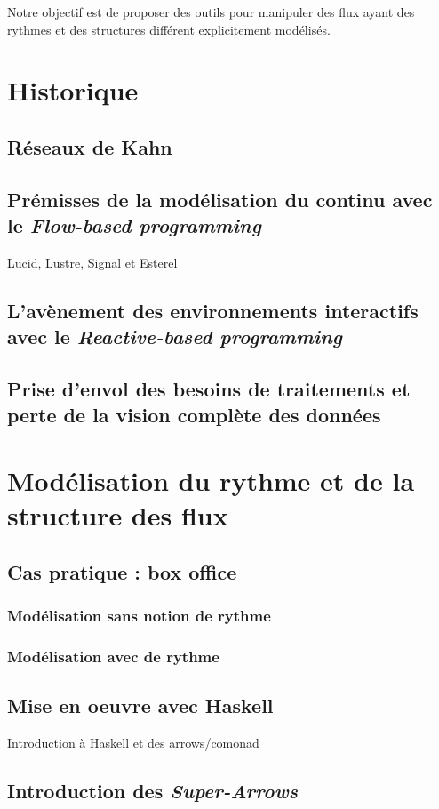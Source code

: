 \documentclass{llncs}
\newcommand{\SAs}{\emph{Super-Arrows}}
\newcommand{\FB}{\emph{Flow-based programming}}
\newcommand{\RP}{\emph{Reactive-based programming}}
\begin{document}
Notre objectif est de proposer des outils pour manipuler des flux ayant des
rythmes et des structures différent explicitement modélisés.

\section{Historique}
\subsection{Réseaux de Kahn}
\cite{kahn}
\subsection{Prémisses de la modélisation du continu avec le \FB}
Lucid, Lustre, Signal et Esterel
\subsection{L'avènement des environnements interactifs avec le \RP}
\subsection{Prise d'envol des besoins de traitements et perte de la vision complète des données}

\section{Modélisation du rythme et de la structure des flux}
\subsection{Cas pratique : box office}
\subsubsection{Modélisation sans notion de rythme}
\subsubsection{Modélisation avec de rythme}
\subsection{Mise en oeuvre avec Haskell}
Introduction à Haskell et des arrows/comonad
\subsection{Introduction des \SAs}
\end{document}
